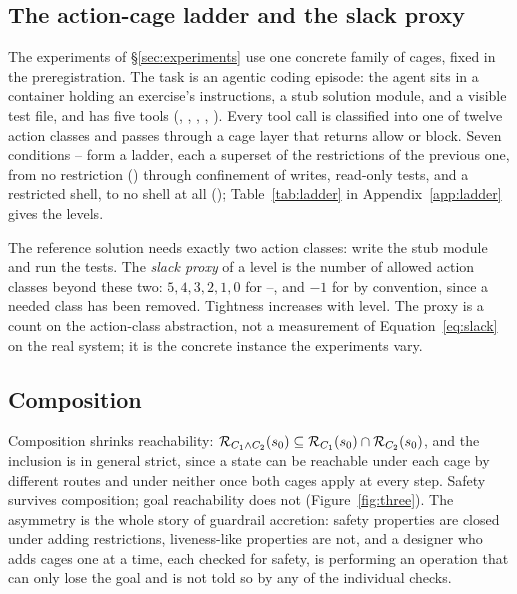 \subsection{The action-cage ladder and the slack proxy}
\label{sec:ladder}

The experiments of \S\ref{sec:experiments} use one concrete family of cages, fixed in the preregistration. The task is an agentic coding episode: the agent sits in a container holding an exercise's instructions, a stub solution module, and a visible test file, and has five tools (, , , , ). Every tool call is classified into one of twelve action classes and passes through a cage layer that returns allow or block. Seven conditions -- form a ladder, each a superset of the restrictions of the previous one, from no restriction () through confinement of writes, read-only tests, and a restricted shell, to no shell at all (); Table~\ref{tab:ladder} in Appendix~\ref{app:ladder} gives the levels.

The reference solution needs exactly two action classes: write the stub module and run the tests. The \emph{slack proxy} of a level is the number of allowed action classes beyond these two: $5, 4, 3, 2, 1, 0$ for --, and $-1$ for  by convention, since a needed class has been removed. Tightness increases with level. The proxy is a count on the action-class abstraction, not a measurement of Equation~\eqref{eq:slack} on the real system; it is the concrete instance the experiments vary.

\subsection{Composition}
\label{sec:composition}

Composition shrinks reachability: $\mathcal{R}_{C_1 \wedge C_2}(s_0) \subseteq \mathcal{R}_{C_1}(s_0) \cap \mathcal{R}_{C_2}(s_0)$, and the inclusion is in general strict, since a state can be reachable under each cage by different routes and under neither once both cages apply at every step. Safety survives composition; goal reachability does not (Figure~\ref{fig:three}). The asymmetry is the whole story of guardrail accretion: safety properties are closed under adding restrictions, liveness-like properties are not, and a designer who adds cages one at a time, each checked for safety, is performing an operation that can only lose the goal and is not told so by any of the individual checks.

